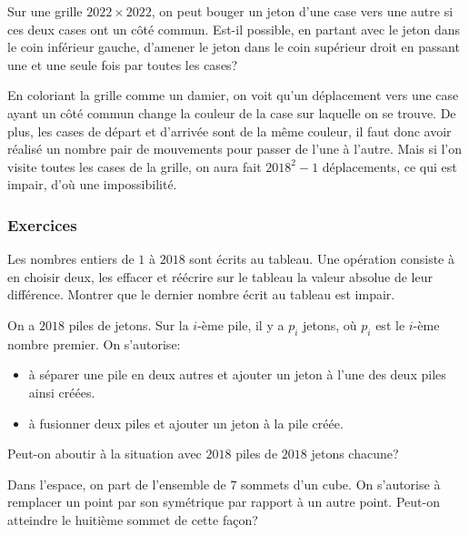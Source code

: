 \begin{exo}
Sur une grille $2022\times2022$, on peut bouger un jeton d'une case vers une autre si ces deux cases ont un côté commun. Est-il possible, en partant avec le jeton dans le coin inférieur gauche, d'amener le jeton dans le coin supérieur droit en passant une et une seule fois par toutes les cases? 
\end{exo}

\begin{sol}
En coloriant la grille comme un damier, on voit qu'un déplacement vers une case ayant un côté commun change la couleur de la case sur laquelle on se trouve. De plus, les cases de départ et d'arrivée sont de la même couleur, il faut donc avoir réalisé un nombre pair de mouvements pour passer de l'une à l'autre. Mais si l'on visite toutes les cases de la grille, on aura fait $2018^2-1$ déplacements, ce qui est impair, d'où une impossibilité.
\end{sol}

\subsubsection{Exercices}

\begin{exo}
Les nombres entiers de $1$ à $2018$ sont écrits au tableau. Une opération consiste à en choisir deux, les effacer et réécrire sur le tableau la valeur absolue de leur différence. Montrer que le dernier nombre écrit au tableau est impair.
\end{exo}

\begin{exo}
On a $2018$ piles de jetons. Sur la $i$-ème pile, il y a $p_i$ jetons, où $p_i$ est le $i$-ème nombre premier. On s'autorise:
\begin{itemize}
\item
à séparer une pile en deux autres et ajouter un jeton à l'une des deux piles ainsi créées.
\item
à fusionner deux piles et ajouter un jeton à la pile créée.
\end{itemize}
Peut-on aboutir à la situation avec $2018$ piles de $2018$ jetons chacune?
\end{exo}

\begin{exo}
Dans l'espace, on part de l'ensemble de $7$ sommets d'un cube. On s'autorise à remplacer un point par son symétrique par rapport à un autre point. Peut-on atteindre le huitième sommet de cette façon?
\end{exo}

